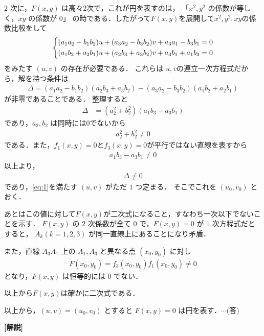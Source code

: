 \documentclass[../../main.tex]{subfiles}
\begin{document}
\begin{multicols}{2}
  次に，$F(x,y)$ は高々$2$次で，これが円を表すのは，
  「$x^2, y^2$ の係数が等しく，$xy$ の係数が $0$」
  の時である．したがって$F(x,y)$を展開して$x^2,y^2,xy$の係数比較をして
  \begin{align}
    \begin{dcases}
      (a_1 a_2 - b_1 b_2) u + (a_3 a_2 - b_3 b_2) v + a_3 a_1 - b_3 b_1 = 0 \\
      (a_1 b_2 + a_2 b_1) u + (a_2 b_3 + a_3 b_2) v + a_3 b_1 + a_1 b_3 = 0
    \end{dcases} \label{eq:1}
  \end{align}
  をみたす $(u,v)$ の存在が必要である．
  これらは $u,v$の連立一次方程式だから，解を持つ条件は
  \begin{align}
    \Delta = (a_1 a_2 - b_1 b_2)(a_2 b_3 + a_3 b_2)-(a_3 a_2 - b_3 b_2)(a_1 b_2 + a_2 b_1)
  \end{align}
  が非零であることである．
  整理すると
  \begin{align}
    \Delta
    & = (a_2^2+b_2^2)(a_1 b_3 - a_3 b_1)
  \end{align}
  であり，$a_2, b_2$ は同時には$0$でないから
  \begin{align}
    a_2^2+b_2^2 \neq 0
  \end{align}
  である．また，$f_1(x,y)=0$と$f_3(x,y)=0$が平行ではない直線を表すから
  \begin{align}
    a_1b_3-a_3b_1 \neq 0
  \end{align}
  以上より，
  \begin{align}
    \Delta \neq 0
  \end{align}
  であり，\cref{eq:1}を満たす $(u,v)$ がただ $1$ つ定まる．
  そこでこれを $(u_0, v_0)$ とおく．

  あとはこの値に対して$F(x,y)$が二次式になること，すなわち一次以下でないことを示す．
  $F(x,y)$ の $2$ 次係数が全て $0$ で，$F(x,y)=0$ が $1$ 次方程式だとすると，
  $A_k(k=1,2,3)$ が同一直線上にあることになり矛盾．

  また，直線 $A_3 A_1$ 上の $A_1, A_3$ と異なる点 $(x_0, y_0)$ に対し
  \begin{align}
    F(x_0, y_0) = f_3(x_0, y_0) f_1(x_0, y_0) \neq 0
  \end{align}
  となり，$F(x,y)$ は恒等的には $0$ でない．

  以上から$F(x,y)$は確かに二次式である．

  以上から，$(u,v) = (u_0, v_0)$ とすると $F(x,y)=0$ は円を表す．$\cdots$(答)

  {\bf [解説]}

  \newpage
\end{multicols}
\end{document}
